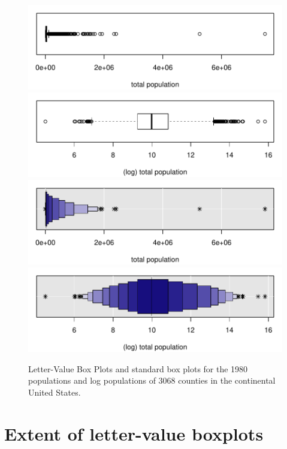 \documentclass[oneside]{article}
\begin{document}
\begin{figure}[hbtp]
  \centering
 	\includegraphics[scale=.5]{counties-lvpop-a.pdf}
 	\includegraphics[scale=.5]{counties-lvpop-c.pdf}
 	\includegraphics[scale=.5]{counties-lvpop-b.pdf}
 	\includegraphics[scale=.5]{counties-lvpop-d.pdf}
 
  \caption{Letter-Value Box Plots and standard box plots for the 1980
  populations and log populations of 3068 counties in the continental United
  States.}
  \label{lvpops} 
\end{figure}

\section{Extent of letter-value boxplots}
\label{sec:extent}
\end{document}

